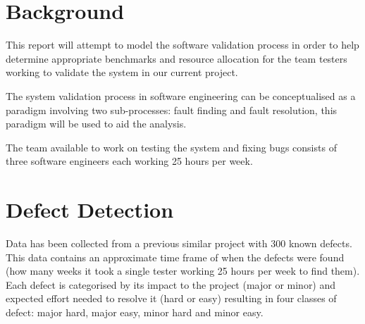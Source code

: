 \documentclass[12pt,a4paper]{article}
\begin{document}
	\begin{titlepage}
		\clearpage\maketitle
		\thispagestyle{empty}
		\tableofcontents
		\newpage

	\end{titlepage}
	
	\section{Background}

		This report will attempt to model the software validation process in order to help determine appropriate benchmarks and resource allocation for the team testers working to validate the system in our current project.
	
		The system validation process in software engineering can be conceptualised as a paradigm involving two sub-processes: fault finding and fault resolution, this paradigm will be used to aid the analysis.
	
		The team available to work on testing the system and fixing bugs consists of three software engineers each working 25 hours per week.
	
	

	\section{Defect Detection}
	
	
		Data has been collected from a previous similar project with 300 known defects.
		This data contains an approximate time frame of when the defects were found (how many weeks it took a single tester working 25 hours per week to find them). Each defect is categorised by its impact to the project (major or minor) and expected effort needed to resolve it (hard or easy) resulting in four classes of defect: major hard, major easy, minor hard and minor easy.
		
\end{document}

